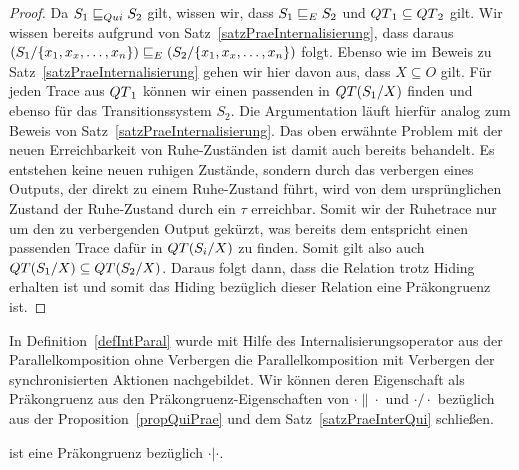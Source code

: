 \begin{proof}
  Da $S_1\sqsubseteq _{Qui} S_2$ gilt, wissen wir, dass $S_1\sqsubseteq _E S_2$ und $QT{}_1\subseteq
  QT{}_2$ gilt. Wir wissen bereits aufgrund von
  Satz~\ref{satzPraeInternalisierung}, dass daraus $(S_1/\{x_1,x_x,\dots
  ,x_n\})\sqsubseteq _E (S_2/\{x_1,x_x,\dots ,x_n\})$ folgt. Ebenso wie im Beweis zu
  Satz~\ref{satzPraeInternalisierung} gehen wir hier davon aus, dass
  $X\subseteq O$ gilt. Für jeden Trace aus $QT{}_1$ können wir einen passenden in
  $QT{}(S_1/X)$ finden und ebenso für das Transitionssystem $S_2$. Die
  Argumentation läuft hierfür analog zum Beweis von
  Satz~\ref{satzPraeInternalisierung}. Das oben erwähnte Problem mit der neuen
  Erreichbarkeit von Ruhe-Zuständen ist damit auch bereits behandelt. Es
  entstehen keine neuen ruhigen Zustände, sondern durch das verbergen eines
  Outputs, der direkt zu einem Ruhe-Zustand führt, wird von dem ursprünglichen
  Zustand der Ruhe-Zustand durch ein $\tau$ erreichbar. Somit wir der
  Ruhetrace nur um den zu verbergenden Output gekürzt, was bereits dem
  entspricht einen passenden Trace dafür in $QT{}(S_i/X)$ zu finden. Somit gilt
  also auch $QT{}(S_1/X)\subseteq QT{}(S_2/X)$. Daraus folgt dann, dass die
  Relation \QRel{} trotz Hiding erhalten ist und somit das Hiding bezüglich
  dieser Relation eine Präkongruenz ist.
\end{proof}

In Definition~\ref{defIntParal} wurde mit Hilfe des Internalisierungsoperator
aus der Parallelkomposition ohne Verbergen die Parallelkomposition mit
Verbergen der synchronisierten Aktionen nachgebildet. Wir können deren
Eigenschaft als Präkongruenz aus den Präkongruenz-Eigenschaften von
$\cdot\|\cdot$ und $\cdot /\cdot$ bezüglich \QRel{} aus der
Proposition~\ref{propQuiPrae} und dem Satz~\ref{satzPraeInterQui} schließen.

\begin{kor}
  \QRel{} ist eine Präkongruenz bezüglich $\cdot |\cdot$.
\end{kor}
